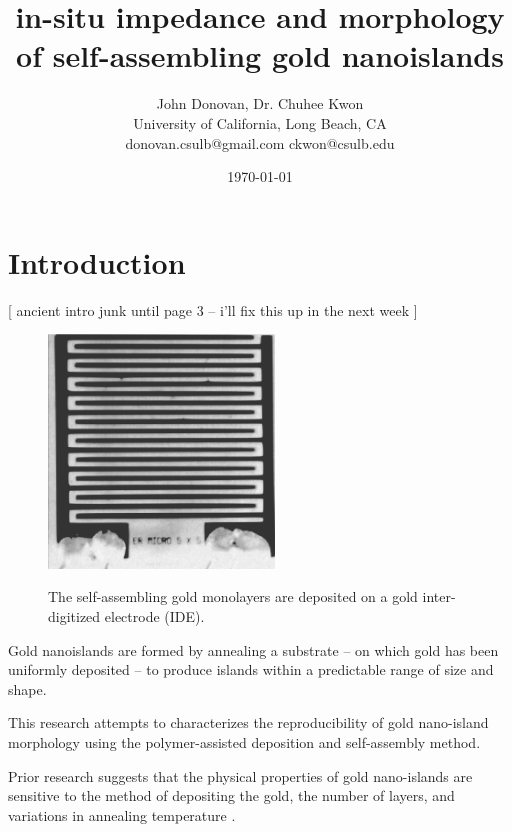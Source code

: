 \documentclass[12pt,oneside,english]{article}
\begin{document}

        \title{in-situ impedance and morphology of self-assembling gold nanoislands}

	\author{John Donovan, Dr. Chuhee Kwon\\
	University of California, Long Beach, CA\\
	{\small donovan.csulb@gmail.com ckwon@csulb.edu}}
	
        \date{\today}

	\maketitle

	\tableofcontents
	

        \section{Introduction}

[ ancient intro junk until page 3 -- i'll fix this up in the next week ]

	\begin{figure}
	\includegraphics[width=60mm]{images/IDE.eps} \label{f:IDE}
	\caption{The self-assembling gold monolayers are deposited on a gold inter-digitized electrode (IDE).}
	\end{figure}
	
	Gold nanoislands  are formed by annealing a substrate -- on which gold has been uniformly deposited -- to produce islands within a predictable range of size and shape.
	
	This research attempts to characterizes the reproducibility of gold nano-island morphology using the polymer-assisted deposition and self-assembly method.
	
	Prior research suggests that the physical properties of gold nano-islands are sensitive to the method of depositing the gold, the number of layers, and variations in annealing temperature \cite{shon11}.
\end{document}
